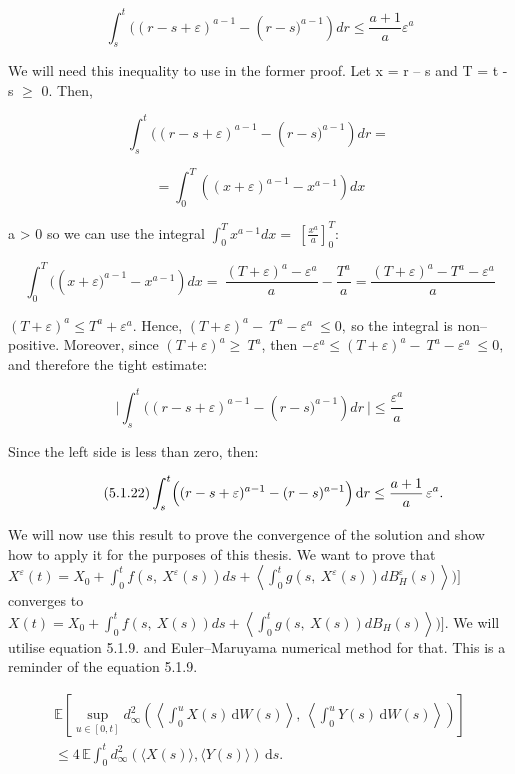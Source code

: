 \documentclass[12pt,a4paper]{report}
\numberwithin{equation}{section}
\begin{document}
\[\int_{s}^{t}{((r - s + \varepsilon)^{a - 1} - \left( r - s)^{a - 1} \right)dr \leq \frac{a + 1}{a}\varepsilon^{a}}\]

We will need this inequality to use in the former proof. Let x = r -- s
and T = t - s $\geq$ 0. Then,

\[\int_{s}^{t}{((r - s + \varepsilon)^{a - 1} - \left( r - s)^{a - 1} \right)dr = \ }\]

\[= \int_{0}^{T}{((x + \varepsilon)^{a - 1} - x^{a - 1})dx}\]

a \textgreater{} 0 so we can use the integral
\(\int_{0}^{T}{x^{a - 1}dx = \ \left\lbrack \frac{x^{a}}{a} \right\rbrack_{0}^{T}}\):

\[\int_{0}^{T}{(\left( x + \varepsilon)^{a - 1} - x^{a - 1} \right)dx = \ \frac{{(T + \varepsilon)}^{a} - \varepsilon^{a}}{a}} - \frac{T^{a}}{a} = \frac{{(T + \varepsilon)}^{a} - T^{a} - \varepsilon^{a}}{a}\]

\((T + \varepsilon)^{a} \leq T^{a} + \varepsilon^{a}\). Hence,
\((T + \varepsilon)^{a} - \ T^{a} - \varepsilon^{a}\  \leq 0,\ \)so the
integral is non--positive. Moreover, since
\((T + \varepsilon)^{a} \geq \ T^{a}\), then
\({- \varepsilon}^{a} \leq (T + \varepsilon)^{a} - \ T^{a} - \varepsilon^{a}\  \leq 0,\)
and therefore the tight estimate:

\[|\int_{s}^{t}{((r - s + \varepsilon)^{a - 1} - \left( r - s)^{a - 1} \right)dr\ | \leq \frac{\varepsilon^{a}}{a}}\]

Since the left side is less than zero, then:

\begin{equation}\tag{5.1.22}\label{eq:5.1.22}
\int_{s}^{t}\Bigl((r-s+\varepsilon)^{a-1}-(r-s)^{a-1}\Bigr)\,\mathrm{d}r
\le \frac{a+1}{a}\,\varepsilon^{a}.
\end{equation}


We will now use this result to prove the convergence of the solution and
show how to apply it for the purposes of this thesis. We want to prove
that
\(X^{\varepsilon}(t) = X_{0} + \int_{0}^{t}{f\left( s,\ X^{\varepsilon}(s) \right)ds + \left\langle \int_{0}^{t}{g\left( s,\ X^{\varepsilon}(s) \right)dB_{H}^{\varepsilon}(s)} \right\rangle)\rbrack}\)
converges to
\(X(t) = X_{0} + \int_{0}^{t}{f\left( s,\ X(s) \right)ds + \left\langle \int_{0}^{t}{g\left( s,\ X(s) \right)dB_{H}(s)} \right\rangle)\rbrack}\).
We will utilise equation 5.1.9. and Euler--Maruyama numerical method for
that. This is a reminder of the equation 5.1.9.

\[
\begin{aligned}
\mathbb{E}\!\left[\sup_{u\in[0,t]}
d_{\infty}^{2}\!\left(
\left\langle \int_{0}^{u} X(s)\,\mathrm{d}W(s)\right\rangle,\,
\left\langle \int_{0}^{u} Y(s)\,\mathrm{d}W(s)\right\rangle
\right)\right] \\
\le 4\,\mathbb{E}\!\int_{0}^{t}
d_{\infty}^{2}\!\left(\langle X(s)\rangle,\langle Y(s)\rangle\right)\,\mathrm{d}s .
\end{aligned}
\]
\end{document}
